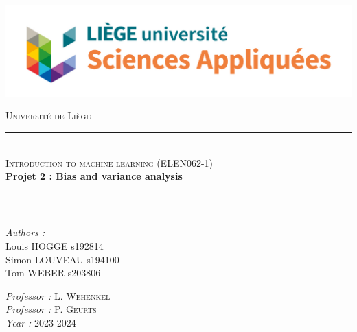 \documentclass[12pt,titlepage]{article}
\newcommand{\HRule}{\rule{\linewidth}{0.5mm}}
\begin{document}
\begin{titlepage}

\begin{center}
    \includegraphics[scale = 0.35]{uliege_facsa.jpg}\\
    
    \vspace{1cm}
    
    \textsc{\huge Université de Liège}\\[1.2cm]
    
    \HRule \\[1cm]
    
    \textsc{\LARGE Introduction to machine learning (ELEN062-1) }\\[1cm]
    
    {\Huge \bfseries Projet 2 : Bias and variance analysis }\\[1.4cm] 
    
    \HRule \\[1cm]
    
\end{center}

\begin{minipage}{0.45\linewidth}
      \begin{flushleft} \large
      
        \emph{Authors : } \\
        Louis \textsc{HOGGE}  s192814\\
        Simon \textsc{LOUVEAU}  s194100\\
        Tom \textsc{WEBER}  s203806
        
      \end{flushleft}
\end{minipage}
\hfill
\begin{minipage}{0.45\linewidth}
      \begin{flushright} \large
      
        \emph{Professor : } L. \textsc{Wehenkel}\\
        \emph{Professor : } P. \textsc{Geurts}\\
        \emph{Year : } 2023-2024 
        
      \end{flushright}
\end{minipage}

\end{titlepage}
\end{document}
